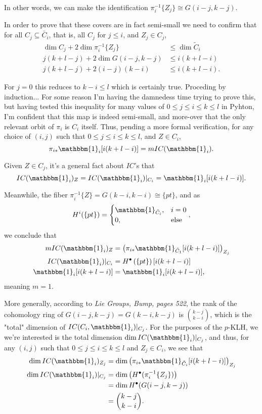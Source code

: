 \documentclass{memoir}
\newcommand{\lb}{\left(}
\newcommand{\rb}{\right)}
\newcommand{\tx}{\text}
\theoremstyle{definition}
\begin{document}
	In other words, we can make the identification $\pi_i^{-1}\{Z_j\}\cong G(i-j, k-j)$.  
	
	In order to prove that these covers are in fact semi-small we need to confirm that for all $C_j\subseteq \bar{C}_i$, that is, all $C_j$ for $j\leq i$, and $Z_j\in C_j$,
	\begin{align*}
		\dim C_j+2\dim\pi_i^{-1}\{Z_j\}&\leq \dim\tilde{C}_i\\
		j(k+l-j)+2\dim G(i-j, k-j)&\leq i(k+l-i)\\
		j(k+l-j)+2(i-j)(k-i)&\leq i(k+l-i).
	\end{align*}

	For $j=0$ this reduces to $k-i\leq l$ which is certainly true.  
	Proceding by induction... For some reason I'm having the damnedess time trying to prove this, but having tested this inequality for many values of $0\leq j\leq i\leq k\leq l$ in Pyhton, I'm confident that this map is indeed semi-small, and more-over that the only relevant orbit of $\pi_i$ is $C_i$ itself.  
	Thus, pending a more formal verification, for any choice of $(i,j)$ such that $0\leq j\leq i\leq k\leq l$, and $Z\in C_i$,
	$$\pi_{i\ast}\mathbbm{1}_i[i(k+l-i)]=m IC(\mathbbm{1}_i).$$
	
	Given $Z\in C_j$, it's a general fact about $IC$'s that
	$$IC(\mathbbm{1}_i)_Z=IC(\mathbbm{1}_i)|_{C_i}=\mathbbm{1}_i[i(k+l-i)].$$
	
	Meanwhile, the fiber $\pi_i^{-1}\{Z\}=G(k-i, k-i)\cong\{pt\}$, and as
	$$H^i(\{pt\})=\begin{cases}
		\mathbbm{1}_{\tilde{C}_i}, & i=0 \\
		0, & \tx{else}
	\end{cases},$$
%
	we conclude that 
	\begin{align*}
	mIC(\mathbbm{1}_i)_Z&=\lb \pi_{i\ast}\mathbbm{1}_{\tilde{C}_1}[i(k+l-i)]\rb_{Z_j}\\
	IC(\mathbbm{1}_i)|_{C_i}&=H^\bullet\lb \{pt\}\rb[i(k+l-i)]\\
	\mathbbm{1}_i[i(k+l-i)]&=\mathbbm{1}_i[i(k+l-i)],
\end{align*}
%
	meaning $m=1$.  
	
	More generally, according to \emph{Lie Groups, Bump, pages 522}, the rank of the cohomology ring of $G(i-j, k-j)=G(k-i, k-j)$ is $\binom{k-j}{k-i}$, which is the "total" dimension of $IC(C_i, \mathbbm{1}_i)|_{C_j}$. 
	For the purposes of the $p$-KLH, we we're interested is the total dimension $\dim IC(\mathbbm{1}_i)|_{C_j}$, and thus, for any $(i,j)$ such that $0\leq j\leq i \leq k\leq l$ and $Z_j\in C_i$, we see that 
	\begin{align*}
		\dim IC(\mathbbm{1}_i)_{Z_j}&=\dim \lb\pi_{i\ast}\mathbbm{1}_{\tilde{C}_i}[i(k+l-i)]\rb_{Z_j}\\
		\dim IC(\mathbbm{1}_i)|_{C_j}&=\dim \lb H^\bullet(\pi_i^{-1}\{Z_j\})\rb\\
		&=\dim H^\bullet(G(i-j, k-j))\\
		&=\binom{k-j}{k-i}.
	\end{align*}
	
\end{document}
